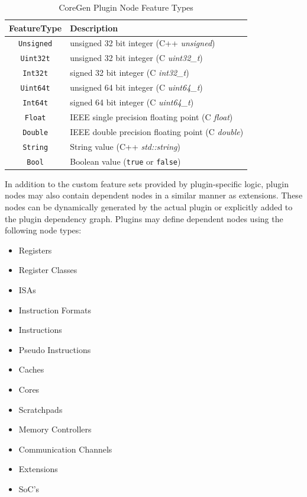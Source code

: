 \documentclass{article}
\begin{document}
\begin{table}[h]
\begin{center}
\caption{CoreGen Plugin Node Feature Types}
\vspace{0.125in}
\label{tab:PluginFeatureTypes}
\begin{tabular}{|c|l|}
\hline
\textbf{FeatureType} & \textbf{Description}\\
\hline
\texttt{Unsigned} & unsigned 32 bit integer (C++ \textit{unsigned})\\
\hline
\texttt{Uint32t} & unsigned 32 bit integer (C \textit{uint32\_t})\\
\hline
\texttt{Int32t} & signed 32 bit integer (C \textit{int32\_t})\\
\hline
\texttt{Uint64t} & unsigned 64 bit integer (C \textit{uint64\_t})\\
\hline
\texttt{Int64t} & signed 64 bit integer (C \textit{uint64\_t}) \\
\hline
\texttt{Float} & IEEE single precision floating point (C \textit{float})\\
\hline
\texttt{Double} & IEEE double precision floating point (C \textit{double})\\
\hline
\texttt{String} & String value (C++ \textit{std::string})\\
\hline
\texttt{Bool} & Boolean value (\texttt{true} or \texttt{false})\\
\hline
\end{tabular}
\end{center}
\end{table}

In addition to the custom feature sets provided by plugin-specific logic, plugin nodes 
may also contain dependent nodes in a similar manner as extensions.  These nodes can be 
dynamically generated by the actual plugin or explicitly added to the plugin dependency graph.  
Plugins may define dependent nodes using the following node types: 

\begin{itemize}
\item Registers
\item Register Classes
\item ISAs
\item Instruction Formats
\item Instructions
\item Pseudo Instructions
\item Caches
\item Cores
\item Scratchpads
\item Memory Controllers
\item Communication Channels
\item Extensions
\item SoC's
\end{itemize}
\end{document}
